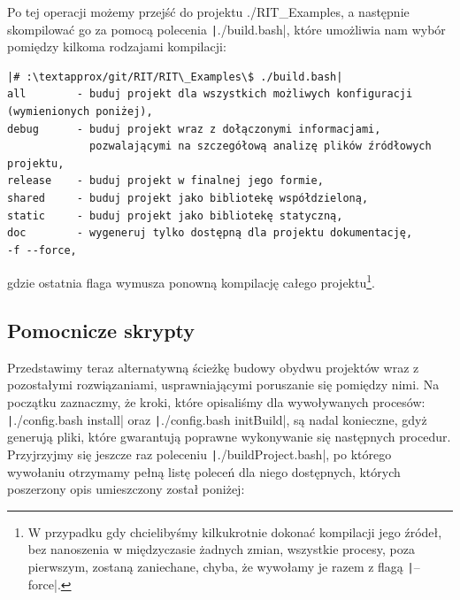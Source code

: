 Po tej operacji możemy przejść do projektu \textsf{./RIT\_Examples}, a następnie skompilować go za pomocą polecenia \texttt|./build.bash|, które umożliwia nam wybór pomiędzy kilkoma rodzajami kompilacji:

\begin{verbatim}
|# :\textapprox/git/RIT/RIT\_Examples\$ ./build.bash|
all        - buduj projekt dla wszystkich możliwych konfiguracji (wymienionych poniżej),
debug      - buduj projekt wraz z dołączonymi informacjami,
             pozwalającymi na szczegółową analizę plików źródłowych projektu,
release    - buduj projekt w finalnej jego formie,
shared     - buduj projekt jako bibliotekę współdzieloną,
static     - buduj projekt jako bibliotekę statyczną,
doc        - wygeneruj tylko dostępną dla projektu dokumentację,
-f --force,
\end{verbatim}
gdzie ostatnia flaga wymusza ponowną kompilację całego projektu\footnote{W przypadku gdy chcielibyśmy kilkukrotnie dokonać kompilacji jego źródeł, bez nanoszenia w międzyczasie żadnych zmian, wszystkie procesy, poza pierwszym, zostaną zaniechane, chyba, że wywołamy je razem z flagą \texttt|--force|.}. 

\subsection{Pomocnicze skrypty}

Przedstawimy teraz alternatywną ścieżkę budowy obydwu projektów wraz z pozostałymi rozwiązaniami, usprawniającymi poruszanie się pomiędzy nimi. Na początku zaznaczmy, że kroki, które opisaliśmy dla wywoływanych procesów: \texttt|./config.bash install| oraz \texttt|./config.bash initBuild|, są nadal konieczne, gdyż generują pliki, które gwarantują poprawne wykonywanie się następnych procedur. Przyjrzyjmy się jeszcze raz poleceniu \texttt|./buildProject.bash|, po którego wywołaniu otrzymamy pełną listę poleceń dla niego dostępnych, których poszerzony opis umieszczony został poniżej:

